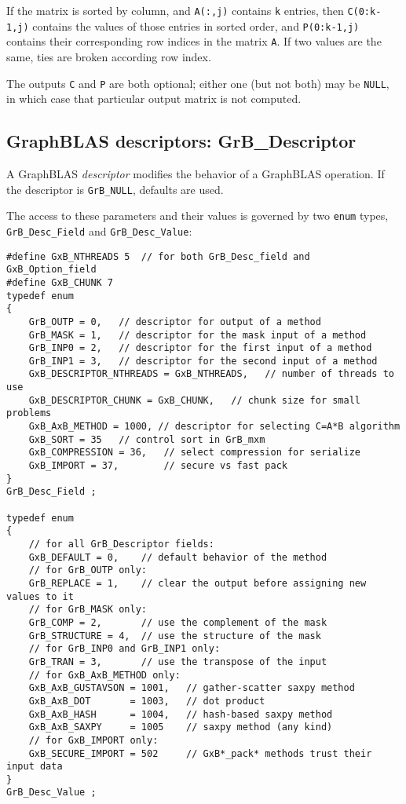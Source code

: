 \documentclass[12pt]{article}
\begin{document}
If the matrix is sorted by column, and \verb'A(:,j)' contains \verb'k' entries,
then \verb'C(0:k-1,j)' contains the values of those entries in sorted order,
and \verb'P(0:k-1,j)' contains their corresponding row indices in the matrix
\verb'A'.  If two values are the same, ties are broken according row index.

The outputs \verb'C' and \verb'P' are both optional; either one (but not both)
may be \verb'NULL', in which case that particular output matrix is not
computed.

\newpage
\subsection{GraphBLAS descriptors: {\sf GrB\_Descriptor}} %
\label{descriptor}

A GraphBLAS {\em descriptor} modifies the behavior of a GraphBLAS operation.
If the descriptor is \verb'GrB_NULL', defaults are used.

The access to these parameters and their values is governed
by two \verb'enum' types, \verb'GrB_Desc_Field' and \verb'GrB_Desc_Value':

\begin{mdframed}[userdefinedwidth=6in]
{\footnotesize
\begin{verbatim}
#define GxB_NTHREADS 5  // for both GrB_Desc_field and GxB_Option_field
#define GxB_CHUNK 7
typedef enum
{
    GrB_OUTP = 0,   // descriptor for output of a method
    GrB_MASK = 1,   // descriptor for the mask input of a method
    GrB_INP0 = 2,   // descriptor for the first input of a method
    GrB_INP1 = 3,   // descriptor for the second input of a method
    GxB_DESCRIPTOR_NTHREADS = GxB_NTHREADS,   // number of threads to use
    GxB_DESCRIPTOR_CHUNK = GxB_CHUNK,   // chunk size for small problems
    GxB_AxB_METHOD = 1000, // descriptor for selecting C=A*B algorithm
    GxB_SORT = 35   // control sort in GrB_mxm
    GxB_COMPRESSION = 36,   // select compression for serialize
    GxB_IMPORT = 37,        // secure vs fast pack
}
GrB_Desc_Field ;

typedef enum
{
    // for all GrB_Descriptor fields:
    GxB_DEFAULT = 0,    // default behavior of the method
    // for GrB_OUTP only:
    GrB_REPLACE = 1,    // clear the output before assigning new values to it
    // for GrB_MASK only:
    GrB_COMP = 2,       // use the complement of the mask
    GrB_STRUCTURE = 4,  // use the structure of the mask
    // for GrB_INP0 and GrB_INP1 only:
    GrB_TRAN = 3,       // use the transpose of the input
    // for GxB_AxB_METHOD only:
    GxB_AxB_GUSTAVSON = 1001,   // gather-scatter saxpy method
    GxB_AxB_DOT       = 1003,   // dot product
    GxB_AxB_HASH      = 1004,   // hash-based saxpy method
    GxB_AxB_SAXPY     = 1005    // saxpy method (any kind)
    // for GxB_IMPORT only:
    GxB_SECURE_IMPORT = 502     // GxB*_pack* methods trust their input data
}
GrB_Desc_Value ;
\end{verbatim} } \end{mdframed}
\end{document}
